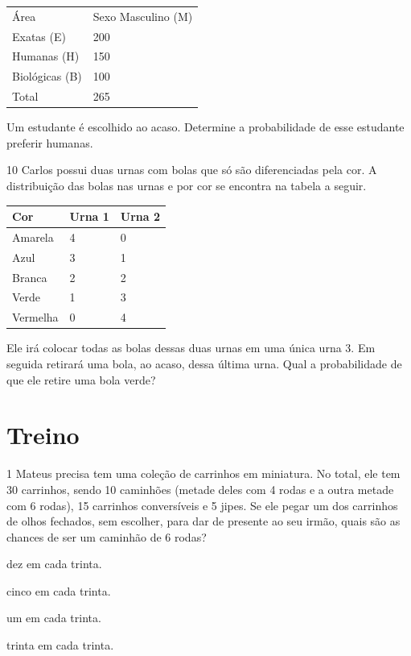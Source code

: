 \begin{longtable}[]{@{}ll@{}}
\toprule
Área & Sexo Masculino (M)\tabularnewline
Exatas (E) & 200\tabularnewline
Humanas (H) & 150\tabularnewline
Biológicas (B) & 100\tabularnewline
Total & 265\tabularnewline
\bottomrule
\end{longtable}

Um estudante é escolhido ao acaso. Determine a probabilidade de esse
estudante preferir humanas.


\num{10} Carlos possui duas urnas com bolas que só são diferenciadas pela cor. A
distribuição das bolas nas urnas e por cor se encontra na tabela a
seguir.

\begin{longtable}[]{@{}lll@{}}
\toprule
Cor & Urna 1 & Urna 2\tabularnewline
\midrule
\endhead
Amarela & 4 & 0\tabularnewline
Azul & 3 & 1\tabularnewline
Branca & 2 & 2\tabularnewline
Verde & 1 & 3\tabularnewline
Vermelha & 0 & 4\tabularnewline
\bottomrule
\end{longtable}

Ele irá colocar todas as bolas dessas duas urnas em uma única urna 3. Em
seguida retirará uma bola, ao acaso, dessa última urna. Qual a
probabilidade de que ele retire uma bola verde?


\section*{Treino}

\num{1} Mateus precisa tem uma coleção de carrinhos em miniatura. No total, ele tem 30 carrinhos, sendo 10 caminhões (metade deles com 4 rodas e a outra metade com 6 rodas), 15 carrinhos conversíveis e 5 jipes. Se ele pegar um dos carrinhos de olhos fechados, sem escolher, para dar de presente ao seu irmão, quais são as chances de ser um caminhão de 6 rodas?

\begin{escolha}
\item
  dez em cada trinta.
\item
  cinco em cada trinta.
\item
  um em cada trinta.
\item
  trinta em cada trinta.
\end{escolha}


